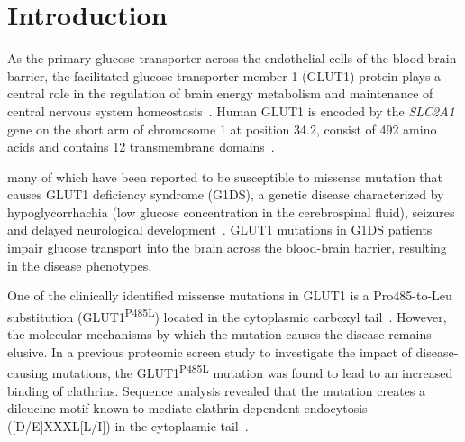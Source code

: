 
\chapter{Introduction} %
\label{Chapter1} %

As the primary glucose transporter across the endothelial cells of the blood-brain barrier, the facilitated glucose transporter member 1 (GLUT1) protein plays a central role in the regulation of brain energy metabolism and maintenance of central nervous system homeostasis~\cite{Pascual}. Human GLUT1 is encoded by the \textit{SLC2A1} gene on the short arm of chromosome 1 at position 34.2, consist of 492 amino acids and contains 12 transmembrane domains~\cite{MUECKLER,Uldry}.


many of which have been reported to be susceptible to missense mutation that causes GLUT1 deficiency syndrome (G1DS), a genetic disease characterized by hypoglycorrhachia (low glucose concentration in the cerebrospinal fluid), seizures and delayed neurological development~\cite{Pascual,De}. GLUT1 mutations in G1DS patients impair glucose transport into the brain across the blood-brain barrier, resulting in the disease phenotypes. 


One of the clinically identified missense mutations in GLUT1 is a Pro485-to-Leu substitution (GLUT1\textsuperscript{P485L}) located in the cytoplasmic carboxyl tail~\cite{Pascual,Slaughter}. However, the molecular mechanisms by which the mutation causes the disease remains elusive. In a previous proteomic screen study to investigate the impact of disease-causing mutations, the GLUT1\textsuperscript{P485L} mutation was found to lead to an increased binding of clathrins. Sequence analysis revealed that the mutation creates a dileucine motif known to mediate clathrin-dependent endocytosis ([D/E]XXXL[L/I]) in the cytoplasmic tail~\cite{Pandey,Dinkel}.



